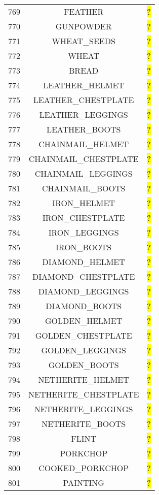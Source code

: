 \documentclass[11pt]{article}
\newcommand\myworries[1]{\sethlcolor{red}\hl{#1}}
\begin{document}
\begin{longtable}{ |c|c|c| }
769 & FEATHER & \myworries{?} \\
770 & GUNPOWDER & \myworries{?} \\
771 & WHEAT\_SEEDS & \myworries{?} \\
772 & WHEAT & \myworries{?} \\
773 & BREAD & \myworries{?} \\
774 & LEATHER\_HELMET & \myworries{?} \\
775 & LEATHER\_CHESTPLATE & \myworries{?} \\
776 & LEATHER\_LEGGINGS & \myworries{?} \\
777 & LEATHER\_BOOTS & \myworries{?} \\
778 & CHAINMAIL\_HELMET & \myworries{?} \\
779 & CHAINMAIL\_CHESTPLATE & \myworries{?} \\
780 & CHAINMAIL\_LEGGINGS & \myworries{?} \\
781 & CHAINMAIL\_BOOTS & \myworries{?} \\
782 & IRON\_HELMET & \myworries{?} \\
783 & IRON\_CHESTPLATE & \myworries{?} \\
784 & IRON\_LEGGINGS & \myworries{?} \\
785 & IRON\_BOOTS & \myworries{?} \\
786 & DIAMOND\_HELMET & \myworries{?} \\
787 & DIAMOND\_CHESTPLATE & \myworries{?} \\
788 & DIAMOND\_LEGGINGS & \myworries{?} \\
789 & DIAMOND\_BOOTS & \myworries{?} \\
790 & GOLDEN\_HELMET & \myworries{?} \\
791 & GOLDEN\_CHESTPLATE & \myworries{?} \\
792 & GOLDEN\_LEGGINGS & \myworries{?} \\
793 & GOLDEN\_BOOTS & \myworries{?} \\
794 & NETHERITE\_HELMET & \myworries{?} \\
795 & NETHERITE\_CHESTPLATE & \myworries{?} \\
796 & NETHERITE\_LEGGINGS & \myworries{?} \\
797 & NETHERITE\_BOOTS & \myworries{?} \\
798 & FLINT & \myworries{?} \\
799 & PORKCHOP & \myworries{?} \\
800 & COOKED\_PORKCHOP & \myworries{?} \\
801 & PAINTING & \myworries{?} \\

\end{longtable}
\end{document}
